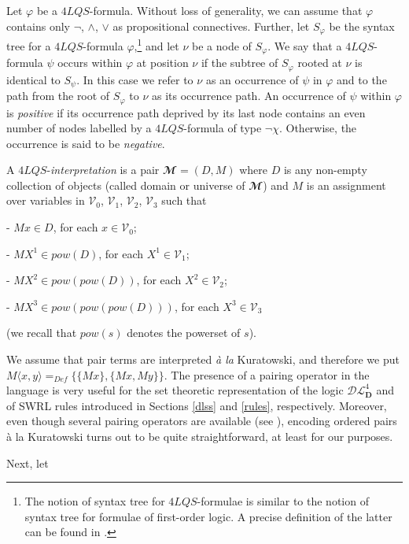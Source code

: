 \documentclass[a4paper]{llncs}
\newcommand{\shdlss}{\mathcal{DL}_{\D}^{4}}
\newcommand{\D}{\mathbf{D}}
\newcommand{\pow}{\textit{pow}}
\begin{document}
Let $\varphi$ be a $4LQS$-formula. Without loss of generality, we can assume that $\varphi$ contains only $\neg$, $\wedge$, $\vee$ as propositional connectives. Further, let $S_{\varphi}$ be the syntax tree for a $4LQS$-formula $\varphi$,\footnote{The notion of syntax tree for $4LQS$-formulae is similar to the notion of syntax tree for formulae of first-order logic. A precise definition of the latter can be found in \cite{DeJo90}.} and let $\nu$ be a node of $S_{\varphi}$. We say that a $4LQS$-formula $\psi$ occurs within $\varphi$ at position $\nu$ if the subtree of $S_{\varphi}$ rooted at $\nu$
is identical to $S_{\psi}$. In this case we refer to $\nu$ as an occurrence of $\psi$ in $\varphi$ and to the path from the root
of $S_{\varphi}$ to $\nu$ as its occurrence path. An occurrence of $\psi$ within $\varphi$ is
\emph{positive} if its occurrence path deprived by its last node contains an even number of nodes labelled by a $4LQS$-formula of type $\neg \chi$. Otherwise, the occurrence is said to be \emph{negative}.

A $4LQS$-\emph{interpretation} is a pair $\mathbfcal{M}=(D,M)$ where $D$ is any non-empty collection of objects (called domain or universe of $\mathbfcal{M}$) and $M$ is an assignment over variables in $\mathcal{V}_0$, $\mathcal{V}_1$, $\mathcal{V}_2$, $\mathcal{V}_3$ such that

\smallskip
{- $Mx \in D$, for each $ x \in \mathcal{V}_0$;}

{- $MX^1 \in \pow(D)$, for each $X^1 \in \mathcal{V}_1$;}

{- $ MX^2 \in \pow(\pow(D))$, for each $X^2 \in \mathcal{V}_2$; }

{- $MX^3 \in \pow(\pow(\pow(D)))$, for each $X^3 \in \mathcal{V}_3$

(we recall that $\pow(s)$ denotes the powerset of $s$).}

\smallskip
\noindent
We assume that pair terms are interpreted \emph{\`a la} Kuratowski, and therefore we put $ M \langle x,y \rangle =_{Def} \{ \{ Mx \},\{ Mx,My \} \}$. The presence of a pairing operator in the language is very useful for the set theoretic representation of the logic $\shdlss$ and of SWRL rules introduced in Sections \ref{dlss} and \ref{rules}, respectively. Moreover, even though several pairing operators are available (see \cite{FormisanoOP04}), encoding ordered pairs \`a la Kuratowski turns out to be quite straightforward, at least for our purposes.




Next, let
\end{document}
